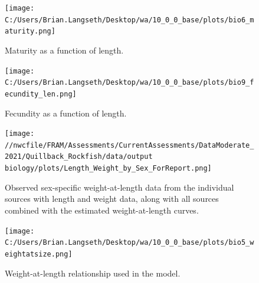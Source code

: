 \documentclass[11pt,
  english,
  a4paper,
]{article}
\begin{document}
\begin{figure}
\centering
\texttt{[image: C:/Users/Brian.Langseth/Desktop/wa/10\_0\_0\_base/plots/bio6\_maturity.png]}
\caption{Maturity as a function of length.\label{fig:maturity}}
\end{figure}

\tagmcend\tagstructend


\begin{figure}
\centering
\texttt{[image: C:/Users/Brian.Langseth/Desktop/wa/10\_0\_0\_base/plots/bio9\_fecundity\_len.png]}
\caption{Fecundity as a function of length.\label{fig:fecundity}}
\end{figure}

\tagmcend\tagstructend


\begin{figure}
\centering
\texttt{[image: //nwcfile/FRAM/Assessments/CurrentAssessments/DataModerate\_2021/Quillback\_Rockfish/data/output biology/plots/Length\_Weight\_by\_Sex\_ForReport.png]}
\caption{Observed sex-specific weight-at-length data from the individual sources with length and weight data, along with all sources combined with the estimated weight-at-length curves.\label{fig:len-weight-survey}}
\end{figure}

\tagmcend\tagstructend


\begin{figure}
\centering
\texttt{[image: C:/Users/Brian.Langseth/Desktop/wa/10\_0\_0\_base/plots/bio5\_weightatsize.png]}
\caption{Weight-at-length relationship used in the model.\label{fig:len-weight}}
\end{figure}

\tagmcend\tagstructend

\end{document}
